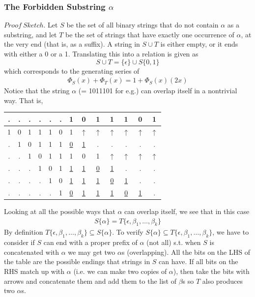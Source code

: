 \documentclass[11pt]{article}
\begin{document}
\subsubsection{The Forbidden Substring $\alpha$}
$Proof \: Sketch.$
Let $S$ be the set of all binary strings that do not contain $\alpha$ as a substring, and let $T$ be the set of strings that have exactly one occurrence of $\alpha$, at the very end (that is, as a suffix). A string in $S \cup T$ is either empty, or it ends with either a 0 or a 1. Translating this into a relation is given as
$$S \cup T = \{\epsilon\} \cup S\{0, 1\}$$
which corresponds to the generating series of \begin{align}
    \Phi_S(x) + \Phi_T(x) = 1 + \Phi_S(x)(2x) 
\end{align}
Notice that the string $\alpha$ (= 1011101 for e.g.) can overlap itself in a nontrivial way. That is, 
\begin{center}
    \begin{tabular}{cccccc|ccccccc}
         . & . & . & . & . & . & 1 & 0 & 1 & 1 & 1 & 0 & 1\\
         \hline
         1 & 0 & 1 & 1 & 1 & 0 & 1 & $\uparrow$ & $\uparrow$ & $\uparrow$ & $\uparrow$ & $\uparrow$ & $\uparrow$\\
         . & 1 & 0 & 1 & 1 & 1 & \underline{0} & \underline{1} & . & . & . & . & .\\
         . & . & 1 & 0 & 1 & 1 & 1 & 0 & 1 & $\uparrow$ & $\uparrow$ & $\uparrow$ & $\uparrow$  \\
         . & . & . & 1 & 0 & 1 & \underline{1} & \underline{1} & \underline{0} & \underline{1} & . & . & .  \\
         . & . & . & . & 1 & 0 & \underline{1} & \underline{1} & \underline{1} & \underline{0} & \underline{1} & . & .  \\
         . & . & . & . & . & 1 & \underline{0} & \underline{1} & \underline{1} & \underline{1} & \underline{0} & \underline{1} & . \\
    \end{tabular}
\end{center}
Looking at all the possible ways that $\alpha$ can overlap itself, we see that in this case \begin{align}S\{\alpha\} = T\{\epsilon, \beta_1, \dots, \beta_k\}\end{align} 
By definition $T\{\epsilon, \beta_1, \dots, \beta_k\} \subseteq S\{\alpha\}$. To verify $S\{\alpha\} \subseteq T\{\epsilon, \beta_1, \dots, \beta_k\}$, we have to consider if $S$ can end with a proper prefix of $\alpha$ (not all) s.t. when $S$ is concatenated with $\alpha$ we may get two $\alpha$s (overlapping). All the bits on the LHS of the table are the possible endings that strings in $S$ can have. If all bits on the RHS match up with $\alpha$ (i.e. we can make two copies of $\alpha$), then take the bits with arrows and concatenate them and add them to the list of $\beta$s so $T$ also produces two $\alpha$s.
\end{document}
